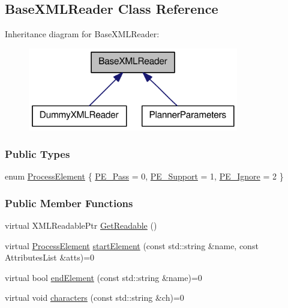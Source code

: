 \hypertarget{classOpenRAVE_1_1BaseXMLReader}{
\subsection{BaseXMLReader Class Reference}
\label{classOpenRAVE_1_1BaseXMLReader}
}


Inheritance diagram for BaseXMLReader:\nopagebreak
\begin{figure}[H]
\begin{center}
\leavevmode
\includegraphics[width=260pt]{classOpenRAVE_1_1BaseXMLReader__inherit__graph}
\end{center}
\end{figure}
\subsubsection*{Public Types}
\begin{DoxyCompactItemize}
\item 
enum \hyperlink{classOpenRAVE_1_1BaseXMLReader_a5f6b74d2490bcfd578227b002ec9c5d9}{ProcessElement} \{ \hyperlink{classOpenRAVE_1_1BaseXMLReader_a5f6b74d2490bcfd578227b002ec9c5d9a55670b1a206d4da09ef69e3690ee7bba}{PE\_\-Pass} = 0, 
\hyperlink{classOpenRAVE_1_1BaseXMLReader_a5f6b74d2490bcfd578227b002ec9c5d9a5123a3d32d744694919844d9675ede67}{PE\_\-Support} = 1, 
\hyperlink{classOpenRAVE_1_1BaseXMLReader_a5f6b74d2490bcfd578227b002ec9c5d9a14953fbbe151fd55cd76395cdccc4af6}{PE\_\-Ignore} = 2
 \}
\end{DoxyCompactItemize}
\subsubsection*{Public Member Functions}
\begin{DoxyCompactItemize}
\item 
virtual XMLReadablePtr \hyperlink{classOpenRAVE_1_1BaseXMLReader_a96a8303765bddf9742cbc422f8a9c2d6}{GetReadable} ()
\item 
virtual \hyperlink{classOpenRAVE_1_1BaseXMLReader_a5f6b74d2490bcfd578227b002ec9c5d9}{ProcessElement} \hyperlink{classOpenRAVE_1_1BaseXMLReader_a96b3e3b4503108964001ad58ab724ac3}{startElement} (const std::string \&name, const AttributesList \&atts)=0
\item 
virtual bool \hyperlink{classOpenRAVE_1_1BaseXMLReader_a3b5c1a1dc1e0965a9e27f139b18db4d9}{endElement} (const std::string \&name)=0
\item 
virtual void \hyperlink{classOpenRAVE_1_1BaseXMLReader_a0b124434353fd2e48d951c2053e63408}{characters} (const std::string \&ch)=0
\end{DoxyCompactItemize}
